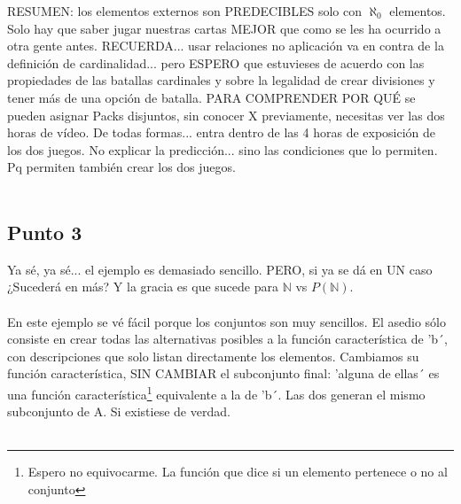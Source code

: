 	\noindent
	RESUMEN: los elementos externos son PREDECIBLES solo con $\aleph_{0}$ elementos. Solo hay que saber jugar nuestras cartas MEJOR que como se les ha ocurrido a otra gente antes. RECUERDA... usar relaciones no aplicación va en contra de la definición de cardinalidad... pero ESPERO que estuvieses de acuerdo con las propiedades de las batallas cardinales y sobre la legalidad de crear divisiones y tener más de una opción de batalla. PARA COMPRENDER POR QUÉ se pueden asignar Packs disjuntos, sin conocer X previamente, necesitas ver las dos horas de vídeo. De todas formas... entra dentro de las 4 horas de exposición de los dos juegos. No explicar la predicción... sino las condiciones que lo permiten. Pq permiten también crear los dos juegos.
	\\\\
	
	\subsection{Punto 3}
	
	\noindent
	Ya sé, ya sé... el ejemplo es demasiado sencillo. PERO, si ya se dá en UN caso ¿Sucederá en más? Y la gracia es que sucede para $\mathbb{N}$ vs $P(\mathbb{N})$.\\\\ 
	
	\noindent
	En este ejemplo se vé fácil porque los conjuntos son muy sencillos. El asedio sólo consiste en crear todas las alternativas posibles a la función característica de 'b´, con descripciones que solo listan directamente los elementos. Cambiamos su función característica, SIN CAMBIAR el subconjunto final: 'alguna de ellas´ es una función característica\footnote{Espero no equivocarme. La función que dice si un elemento pertenece o no al conjunto} equivalente a la de 'b´. Las dos generan el mismo subconjunto de A. Si existiese de verdad.\\\\
	
